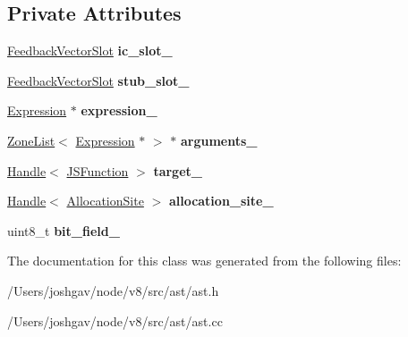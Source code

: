 \subsection*{Private Attributes}
\begin{DoxyCompactItemize}
\item 
\hyperlink{classv8_1_1internal_1_1_feedback_vector_slot}{Feedback\+Vector\+Slot} {\bfseries ic\+\_\+slot\+\_\+}\hypertarget{classv8_1_1internal_1_1_call_ae2fcda95b273a3780b83a01cd579750e}{}\label{classv8_1_1internal_1_1_call_ae2fcda95b273a3780b83a01cd579750e}

\item 
\hyperlink{classv8_1_1internal_1_1_feedback_vector_slot}{Feedback\+Vector\+Slot} {\bfseries stub\+\_\+slot\+\_\+}\hypertarget{classv8_1_1internal_1_1_call_a42e330d67a0368f362b773a3f3a3dea1}{}\label{classv8_1_1internal_1_1_call_a42e330d67a0368f362b773a3f3a3dea1}

\item 
\hyperlink{classv8_1_1internal_1_1_expression}{Expression} $\ast$ {\bfseries expression\+\_\+}\hypertarget{classv8_1_1internal_1_1_call_a8380293749aa2ec3a961fed9cbe98baf}{}\label{classv8_1_1internal_1_1_call_a8380293749aa2ec3a961fed9cbe98baf}

\item 
\hyperlink{classv8_1_1internal_1_1_zone_list}{Zone\+List}$<$ \hyperlink{classv8_1_1internal_1_1_expression}{Expression} $\ast$ $>$ $\ast$ {\bfseries arguments\+\_\+}\hypertarget{classv8_1_1internal_1_1_call_a07d6afe97d30a0e49bd7a9334a8f4ebb}{}\label{classv8_1_1internal_1_1_call_a07d6afe97d30a0e49bd7a9334a8f4ebb}

\item 
\hyperlink{classv8_1_1internal_1_1_handle}{Handle}$<$ \hyperlink{classv8_1_1internal_1_1_j_s_function}{J\+S\+Function} $>$ {\bfseries target\+\_\+}\hypertarget{classv8_1_1internal_1_1_call_aa1254af4c0351be292edb6362be22c90}{}\label{classv8_1_1internal_1_1_call_aa1254af4c0351be292edb6362be22c90}

\item 
\hyperlink{classv8_1_1internal_1_1_handle}{Handle}$<$ \hyperlink{classv8_1_1internal_1_1_allocation_site}{Allocation\+Site} $>$ {\bfseries allocation\+\_\+site\+\_\+}\hypertarget{classv8_1_1internal_1_1_call_a87ffa41f7b98d69f6cf9b136d0ae8a49}{}\label{classv8_1_1internal_1_1_call_a87ffa41f7b98d69f6cf9b136d0ae8a49}

\item 
uint8\+\_\+t {\bfseries bit\+\_\+field\+\_\+}\hypertarget{classv8_1_1internal_1_1_call_aa5ec905cf60e5451c7d437b0d22d34a1}{}\label{classv8_1_1internal_1_1_call_aa5ec905cf60e5451c7d437b0d22d34a1}

\end{DoxyCompactItemize}


The documentation for this class was generated from the following files\+:\begin{DoxyCompactItemize}
\item 
/\+Users/joshgav/node/v8/src/ast/ast.\+h\item 
/\+Users/joshgav/node/v8/src/ast/ast.\+cc\end{DoxyCompactItemize}
